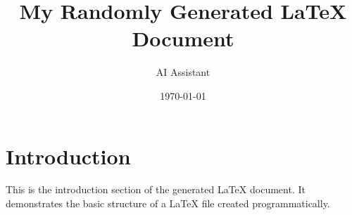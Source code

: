 \documentclass{article}
\title{My Randomly Generated LaTeX Document}
\author{AI Assistant}
\date{\today}
\begin{document}
\maketitle

\section{Introduction}
This is the introduction section of the generated LaTeX document. It demonstrates the basic structure of a LaTeX file created programmatically.
\end{document}
